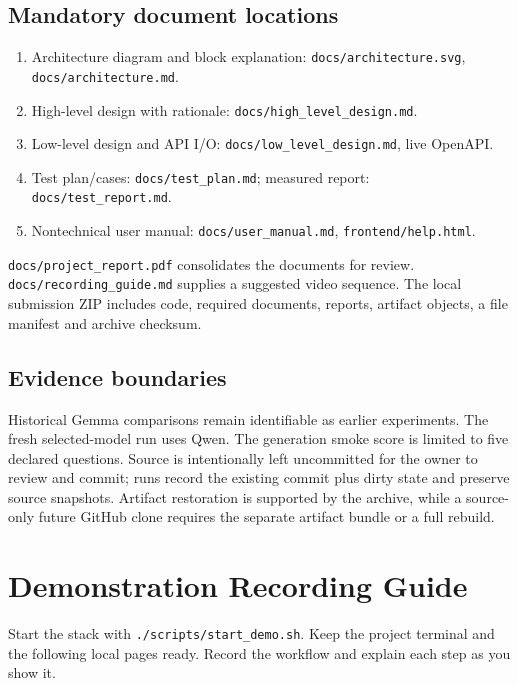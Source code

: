 \documentclass[11pt,a4paper]{article}
\begin{document}
\subsection*{Mandatory document locations}
\begin{enumerate}
\item Architecture diagram and block explanation: \texttt{docs/\allowbreak{}architecture.\allowbreak{}svg}, \texttt{docs/\allowbreak{}architecture.\allowbreak{}md}.
\item High-level design with rationale: \texttt{docs/\allowbreak{}high\_\allowbreak{}level\_\allowbreak{}design.\allowbreak{}md}.
\item Low-level design and API I/O: \texttt{docs/\allowbreak{}low\_\allowbreak{}level\_\allowbreak{}design.\allowbreak{}md}, live OpenAPI.
\item Test plan/cases: \texttt{docs/\allowbreak{}test\_\allowbreak{}plan.\allowbreak{}md}; measured report: \texttt{docs/\allowbreak{}test\_\allowbreak{}report.\allowbreak{}md}.
\item Nontechnical user manual: \texttt{docs/\allowbreak{}user\_\allowbreak{}manual.\allowbreak{}md}, \texttt{frontend/\allowbreak{}help.\allowbreak{}html}.
\end{enumerate}
\texttt{docs/\allowbreak{}project\_\allowbreak{}report.\allowbreak{}pdf} consolidates the documents for review. \texttt{docs/\allowbreak{}recording\_\allowbreak{}guide.\allowbreak{}md} supplies a suggested video sequence. The local submission ZIP includes code, required documents, reports, artifact objects, a file manifest and archive checksum.

\subsection*{Evidence boundaries}
Historical Gemma comparisons remain identifiable as earlier experiments. The fresh selected-model run uses Qwen. The generation smoke score is limited to five declared questions. Source is intentionally left uncommitted for the owner to review and commit; runs record the existing commit plus dirty state and preserve source snapshots. Artifact restoration is supported by the archive, while a source-only future GitHub clone requires the separate artifact bundle or a full rebuild.

\clearpage
\section*{Demonstration Recording Guide}
Start the stack with \texttt{.\allowbreak{}/\allowbreak{}scripts/\allowbreak{}start\_\allowbreak{}demo.\allowbreak{}sh}. Keep the project terminal and the following local pages ready. Record the workflow and explain each step as you show it.
\end{document}

